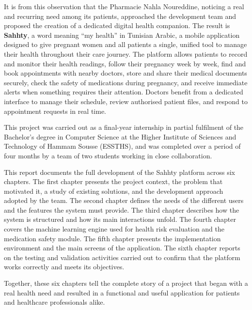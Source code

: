 It is from this observation that the Pharmacie Nahla Noureddine, noticing a real and
recurring need among its patients, approached the development team and proposed the
creation of a dedicated digital health companion. The result is \textbf{Sahhty}, a word
meaning ``my health'' in Tunisian Arabic, a mobile application designed to give pregnant
women and all patients a single, unified tool to manage their health throughout their care
journey. The platform allows patients to record and monitor their health readings, follow
their pregnancy week by week, find and book appointments with nearby doctors, store and
share their medical documents securely, check the safety of medications during pregnancy,
and receive immediate alerts when something requires their attention. Doctors benefit from
a dedicated interface to manage their schedule, review authorised patient files, and respond
to appointment requests in real time.

This project was carried out as a final-year internship in partial fulfilment of the
Bachelor's degree in Computer Science at the Higher Institute of Sciences and Technology
of Hammam Sousse (ESSTHS), and was completed over a period of four months by a team
of two students working in close collaboration.

This report documents the full development of the Sahhty platform across six chapters.
The first chapter presents the project context, the problem that motivated it, a study of
existing solutions, and the development approach adopted by the team. The second chapter
defines the needs of the different users and the features the system must provide. The
third chapter describes how the system is structured and how its main interactions unfold.
The fourth chapter covers the machine learning engine used for health risk evaluation and
the medication safety module. The fifth chapter presents the implementation environment
and the main screens of the application. The sixth chapter reports on the testing and
validation activities carried out to confirm that the platform works correctly and meets
its objectives.

Together, these six chapters tell the complete story of a project that began with a real
health need and resulted in a functional and useful application for patients and healthcare
professionals alike.
